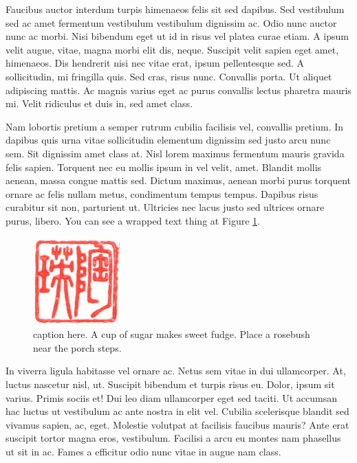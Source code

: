 \documentclass[
  9pt,
  letterpaper,
  DIV=11,
  numbers=noendperiod]{scrartcl}
\begin{document}
Faucibus auctor interdum turpis himenaeos felis sit sed dapibus. Sed
vestibulum sed ac amet fermentum vestibulum vestibulum dignissim ac.
Odio nunc auctor nunc ac morbi. Nisi bibendum eget ut id in risus vel
platea curae etiam. A ipsum velit augue, vitae, magna morbi elit dis,
neque. Suscipit velit sapien eget amet, himenaeos. Dis hendrerit nisi
nec vitae erat, ipsum pellentesque sed. A sollicitudin, mi fringilla
quis. Sed cras, risus nunc. Convallis porta. Ut aliquet adipiscing
mattis. Ac magnis varius eget ac purus convallis lectus pharetra mauris
mi. Velit ridiculus et duis in, sed amet class.

Nam lobortis pretium a semper rutrum cubilia facilisis vel, convallis
pretium. In dapibus quis urna vitae sollicitudin elementum dignissim sed
justo arcu nunc sem. Sit dignissim amet class at. Nisl lorem maximus
fermentum mauris gravida felis sapien. Torquent nec eu mollis ipsum in
vel velit, amet. Blandit mollis aenean, massa congue mattis sed. Dictum
maximus, aenean morbi purus torquent ornare ac felis nullam metus,
condimentum tempus tempus. Dapibus risus curabitur sit non, parturient
ut. Ultricies nec lacus justo sed ultrices ornare purus, libero. You can
see a wrapped text thing at Figure \ref{fig-wrap2}.

\begin{figure}
  \centering
  \includegraphics[width=0.3\textwidth,height=0.3\textwidth]{stamp1a.jpg}
  \caption{\label{fig-wrap2}caption here. A cup of sugar makes sweet fudge. Place a rosebush near the porch steps.}
  \vspace{-6pt}
\end{figure}

In viverra ligula habitasse vel ornare ac. Netus sem vitae in dui
ullamcorper. At, luctus nascetur nisl, ut. Suscipit bibendum et turpis
risus eu. Dolor, ipsum sit varius. Primis sociis et! Dui leo diam
ullamcorper eget sed taciti. Ut accumsan hac luctus ut vestibulum ac
ante nostra in elit vel. Cubilia scelerisque blandit sed vivamus sapien,
ac, eget. Molestie volutpat at facilisis faucibus mauris? Ante erat
suscipit tortor magna eros, vestibulum. Facilisi a arcu eu montes nam
phasellus ut sit in ac. Fames a efficitur odio nunc vitae in augue nam
class.
\end{document}
